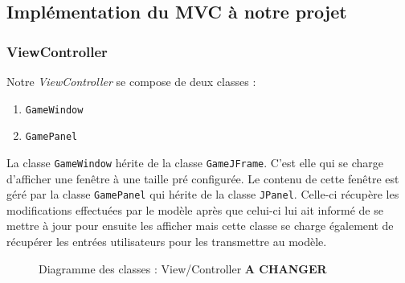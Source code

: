 	\subsection{Implémentation du MVC à notre projet}
		\subsubsection{ViewController}
		Notre \textit{ViewController} se compose de deux classes : 
		\begin{multicols}{2}
        \begin{enumerate}
            \item \texttt{GameWindow}
            \item \texttt{GamePanel}
        \end{enumerate}
	    \end{multicols}
	    La classe \texttt{GameWindow} hérite de la classe \texttt{GameJFrame}. C'est elle 
	    qui se charge d'afficher une fenêtre à une taille pré configurée. Le contenu
	    de cette fenêtre est géré par la classe \texttt{GamePanel} qui hérite de la 
	    classe \texttt{JPanel}. Celle-ci récupère les modifications effectuées par le 
	    modèle après que celui-ci lui ait informé de se mettre à jour pour ensuite 
	    les afficher mais cette classe se charge également de récupérer les entrées 
	    utilisateurs pour les transmettre
	    au modèle.
	    
		
		\begin{figure}[H]
        \centering
        \quad
            \caption {Diagramme des classes : View/Controller \textbf{A CHANGER}}
        \end{figure}		
            
